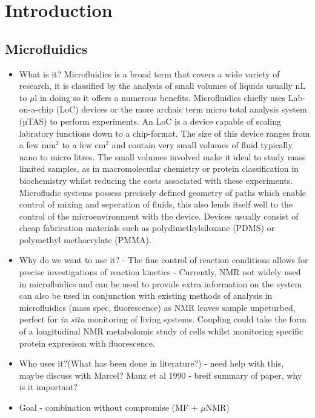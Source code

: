 
\chapter{Introduction}

\section{Microfluidics}

\begin{itemize}
  \item What is it?
Microfluidics is a broad term that covers a wide variety of research, it is classified by the analysis of small
volumes of liquids usually nL to $\mu$l in doing so it offers a numerous benefits. Microfluidics chiefly uses
Lab-on-a-chip (LoC) devices or the more archaic term micro total analysis system (µTAS) to perform experiments. An LoC is
a device capable of scaling labratory functions down to a chip-format. The size of this device ranges from a few mm$^2$ to a few cm$^2$
and contain very small volumes of fluid typically nano to micro litres. The small 
volumes involved make it ideal to study mass limited samples, as in macromolecular chemistry or protein classification
in biochemistry whilst reducing the costs associated with these experiments. Microfludic systems possess precisely defined
geometry of paths which enable control of mixing and seperation of fluids, this also lends itself well to the control of the
microenvironment with the device. Devices usually consist of cheap fabrication materials such as polydimethylsiloxane
(PDMS) or polymethyl methacrylate (PMMA).
  \item Why do we want to use it?
- The fine control of reaction conditions allows for precise investigations of reaction kinetics
- Currently, NMR not widely used in microfluidics and can be used to provide extra information on the system
can also be used in conjunction with existing methods of analysis in microfluidics (mass spec, fluorescence)
as NMR leaves sample unpeturbed, perfect for \textit{in situ} monitoring of living systems. Coupling
could take the form of a longitudinal NMR metabolomic study of cells whilst monitoring specific protein
expresison with fluorescence.
  \item Who uses it?(What has been done in literature?)
- need help with this, maybe discuss with Marcel? Manz et al 1990 - breif summary of paper, why is it important?
  \item Goal - combination without compromise (MF + $\mu$NMR)

\end{itemize}
